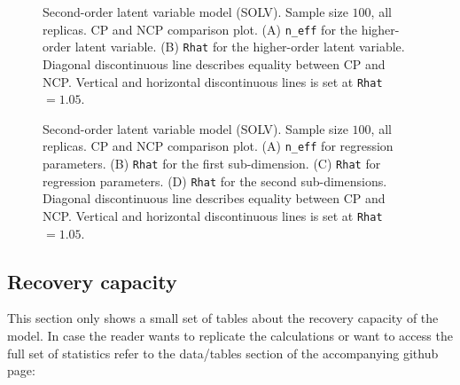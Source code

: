 %
\begin{figure}[H]
	\centering
	\begin{subfigure}
		\texttt{[image: SOLV\_100\_neff6]}
	\end{subfigure}
	\begin{subfigure}
		\texttt{[image: SOLV\_100\_Rhat6]}
	\end{subfigure}
	\caption[Second-order latent variable model (SOLV). Sample size $100$, all replicas. CP and NCP comparison plot.]%
	{Second-order latent variable model (SOLV). Sample size $100$, all replicas. CP and NCP comparison plot. (A) \texttt{n\_eff} for the higher-order latent variable. (B) \texttt{Rhat} for the higher-order latent variable. Diagonal discontinuous line describes equality between CP and NCP. Vertical and horizontal discontinuous lines is set at \texttt{Rhat}$=1.05$. }
	\label{fig:SOLV_stat2}
\end{figure}
%
\begin{figure}[H]
	\centering
	\begin{subfigure}
		\texttt{[image: SOLV\_100\_neff2]}
	\end{subfigure}
	\begin{subfigure}
		\texttt{[image: SOLV\_100\_Rhat2]}
	\end{subfigure}
	\caption[Second-order latent variable model (SOLV). Sample size $100$, all replicas. CP and NCP comparison plot.]%
	{Second-order latent variable model (SOLV). Sample size $100$, all replicas. CP and NCP comparison plot. (A) \texttt{n\_eff} for regression parameters. (B) \texttt{Rhat} for the first sub-dimension. (C) \texttt{Rhat} for regression parameters. (D) \texttt{Rhat} for the second sub-dimensions. Diagonal discontinuous line describes equality between CP and NCP. Vertical and horizontal discontinuous lines is set at \texttt{Rhat}$=1.05$. }
	\label{fig:SOLV_stat3}
\end{figure}




\subsection{Recovery capacity} \label{sub_sect:recovery}

This section only shows a small set of tables about the recovery capacity of the model. In case the reader wants to replicate the calculations or want to access the full set of statistics refer to the data/tables section of the accompanying github page:

